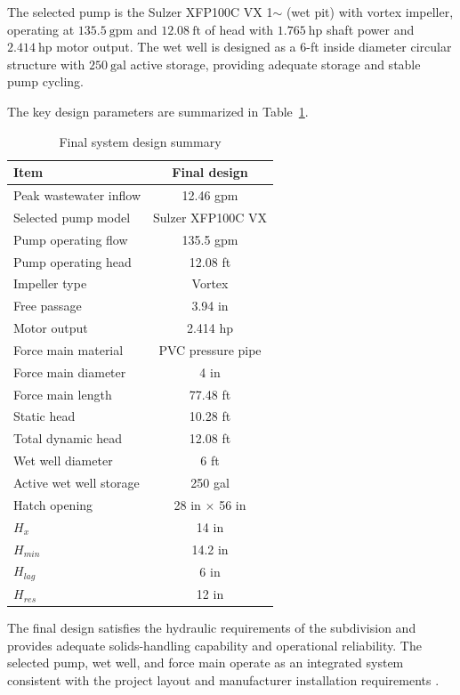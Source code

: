 The selected pump is the Sulzer XFP100C VX 1$\sim$ (wet pit) with vortex impeller, operating at $135.5~\text{gpm}$ and $12.08~\text{ft}$ of head with $1.765~\text{hp}$ shaft power and $2.414~\text{hp}$ motor output. The wet well is designed as a $6$-ft inside diameter circular structure with $250~\text{gal}$ active storage, providing adequate storage and stable pump cycling.

The key design parameters are summarized in Table~\ref{tab:design_summary}.

\begin{table}[H]
\centering
\caption{Final system design summary}
\label{tab:design_summary}
\begin{tabular}{lc}
\toprule
Item & Final design \\
\midrule
Peak wastewater inflow & 12.46 gpm \\
Selected pump model & Sulzer XFP100C VX \\
Pump operating flow & 135.5 gpm \\
Pump operating head & 12.08 ft \\
Impeller type & Vortex \\
Free passage & 3.94 in \\
Motor output & 2.414 hp \\
Force main material & PVC pressure pipe \\
Force main diameter & 4 in \\
Force main length & 77.48 ft \\
Static head & 10.28 ft \\
Total dynamic head & 12.08 ft \\
Wet well diameter & 6 ft \\
Active wet well storage & 250 gal \\
Hatch opening & 28 in $\times$ 56 in \\
$H_x$ & 14 in \\
$H_{min}$ & 14.2 in \\
$H_{lag}$ & 6 in \\
$H_{res}$ & 12 in \\
\bottomrule
\end{tabular}
\end{table}

The final design satisfies the hydraulic requirements of the subdivision and provides adequate solids-handling capability and operational reliability. The selected pump, wet well, and force main operate as an integrated system consistent with the project layout and manufacturer installation requirements \cite{ProjectD_Colebrooke_2020}.

